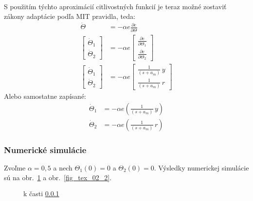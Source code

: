 \documentclass[a4paper, 10pt, ]{article}
\begin{document}
S použitím týchto aproximácií citlivostných funkcií je teraz možné zostaviť zákony adaptácie podľa MIT pravidla, teda:
\begin{subequations}
    \begin{align}
        \dot \Theta &= - \alpha e \frac{\partial e}{\partial \Theta} \\
        \begin{bmatrix} \dot \Theta_1 \\ \dot \Theta_2 \end{bmatrix} &= - \alpha e \begin{bmatrix} \frac{\partial e}{\partial \Theta_1} \\ \frac{\partial e}{\partial \Theta_2} \end{bmatrix} \\
        \begin{bmatrix} \dot \Theta_1 \\ \dot \Theta_2 \end{bmatrix} &= - \alpha e \begin{bmatrix} \frac{1}{\left( s + a_m \right)}\, y \\ \frac{1}{\left( s + a_m \right)}\, r \end{bmatrix}
    \end{align}
\end{subequations}
Alebo samostatne zapísané:
\begin{subequations}
    \begin{align}
        \dot \Theta_1 &= - \alpha e \left( \frac{1}{\left( s + a_m \right)}\, y \right) \\
        \dot \Theta_2 &= - \alpha e \left( \frac{1}{\left( s + a_m \right)}\, r \right)
    \end{align}
\end{subequations}




\subsubsection{Numerické simulácie}
\label{ss1rnumsim}

Zvoľme $\alpha = 0,5$ a nech $\Theta_1(0) = 0$ a $\Theta_2(0) = 0$. Výsledky numerickej simulácie sú na obr.~\ref{fig_tex_01_2} a obr.~\ref{fig_tex_02_2}.








\begin{figure}[t]
	\centering


	\caption{k časti \ref{ss1rnumsim}}
	\label{fig_tex_01_2}

\end{figure}
\end{document}
